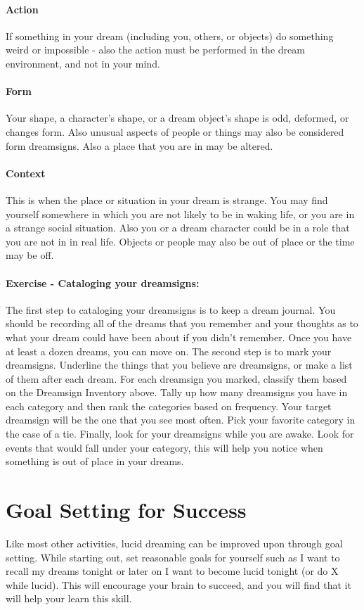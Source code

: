 \documentclass{book}
\begin{document}
\paragraph{Action} If something in your dream (including you, others, or objects) do something weird or impossible - also the action must be performed in the dream environment, and not in your mind.

\paragraph{Form} Your shape, a character's shape, or a dream object's shape is odd, deformed, or changes form. Also unusual aspects of people or things may also be considered form dreamsigns. Also a place that you are in may be altered.


\paragraph{Context} This is when the place or situation in your dream is strange. You may find yourself somewhere in which you are not likely to be in waking life, or you are in a strange social situation. Also you or a dream character could be in a role that you are not in in real life. Objects or people may also be out of place or the time may be off.

\paragraph{Exercise - Cataloging your dreamsigns:} The first step to cataloging your dreamsigns is to keep a dream journal. You should be recording all of the dreams that you remember and your thoughts as to what your dream could have been about if you didn't remember. Once you have at least a dozen dreams, you can move on. The second step is to mark your dreamsigns. Underline the things that you believe are dreamsigns, or make a list of them after each dream. For each dreamsign you marked, classify them based on the Dreamsign Inventory above. Tally up how many dreamsigns you have in each category and then rank the categories based on frequency. Your target dreamsign will be the one that you see most often. Pick your favorite category in the case of a tie. Finally, look for your dreamsigns while you are awake. Look for events that would fall under your category, this will help you notice when something is out of place in your dreams.

\section{Goal Setting for Success}
Like most other activities, lucid dreaming can be improved upon through goal setting. While starting out, set reasonable goals for yourself such as I want to recall my dreams tonight or later on I want to become lucid tonight (or do X while lucid). This will encourage your brain to succeed, and you will find that it will help your learn this skill.
\end{document}
